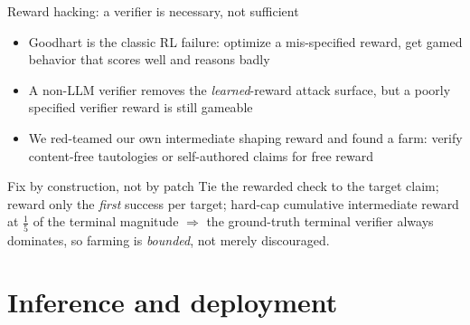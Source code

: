\documentclass[aspectratio=169]{beamer}
\begin{document}
\begin{frame}{Reward hacking: a verifier is necessary, not sufficient}
  \begin{itemize}
    \item Goodhart is the classic RL failure: optimize a mis-specified reward, get gamed behavior that scores well and reasons badly
    \item A non-LLM verifier removes the \emph{learned}-reward attack surface, but a poorly specified verifier reward is still gameable
    \item We red-teamed our own intermediate shaping reward and found a farm: verify content-free tautologies or self-authored claims for free reward
  \end{itemize}
  \begin{alertblock}{Fix by construction, not by patch}
    Tie the rewarded check to the target claim; reward only the \emph{first} success per target;
    hard-cap cumulative intermediate reward at $\tfrac{1}{5}$ of the terminal magnitude $\Rightarrow$
    the ground-truth terminal verifier always dominates, so farming is \emph{bounded}, not merely discouraged.
  \end{alertblock}
\end{frame}

\section{Inference and deployment}
\end{document}
